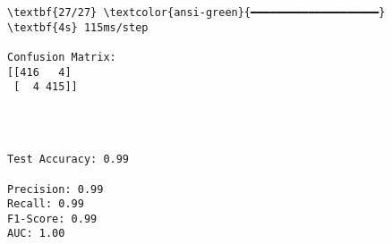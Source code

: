 \documentclass[11pt]{article}
\begin{document}
    \begin{Verbatim}[commandchars=\\\{\}]
\textbf{27/27} \textcolor{ansi-green}{━━━━━━━━━━━━━━━━━━━━} \textbf{4s} 115ms/step

Confusion Matrix:
[[416   4]
 [  4 415]]
    \end{Verbatim}

    \begin{center}
    \end{center}
    { \hspace*{\fill} \\}
    
    \begin{Verbatim}[commandchars=\\\{\}]

Test Accuracy: 0.99

Precision: 0.99
Recall: 0.99
F1-Score: 0.99
AUC: 1.00
    \end{Verbatim}

    \begin{center}
    \end{center}
    { \hspace*{\fill} \\}
    

    
    
    
\end{document}
